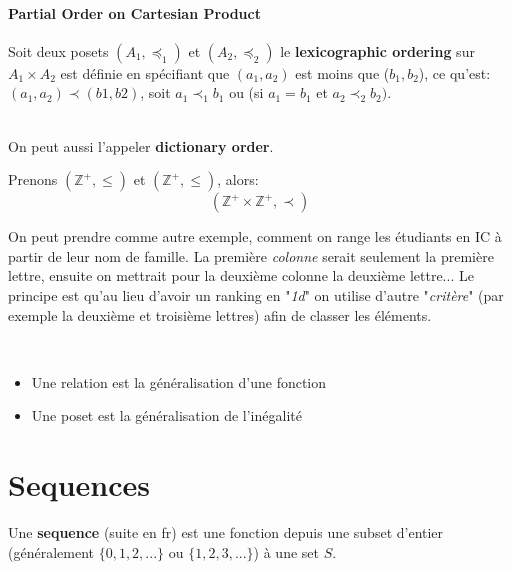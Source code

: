 \paragraph{Partial Order on Cartesian Product}
\begin{definition}
Soit deux posets $(A_1, \preceq_1)$ et $(A_2, \preceq_2)$ le \textbf{lexicographic ordering} sur $A_1 \times A_2$ est définie en spécifiant que $(a_1, a_2)$ est moins que ($b_1, b_2$), ce qu'est:
$(a_1, a_2) \prec (b1, b2)$, 
soit $a_1 \prec_1 b_1$ ou (si $a_1 = b_1$ et $a_2 \prec_2 b_2)$.
\end{definition}
\\

On peut aussi l'appeler \textbf{dictionary order}.

\begin{exemple}
    
Prenons $(\mathbb{Z}^+, \leq)$ et $(\mathbb{Z}^+, \leq)$, alors:
\begin{equation*}
    (\mathbb{Z}^+ \times \mathbb{Z}^+, \prec) 
\end{equation*}

On peut prendre comme autre exemple, comment on range les étudiants en IC à partir de leur nom de famille. La première \textit{colonne} serait seulement la première lettre, ensuite on mettrait pour la deuxième colonne la deuxième lettre... Le principe est qu'au lieu d'avoir un ranking en "\textit{1d}" on utilise d'autre "\textit{critère}" (par exemple la deuxième et troisième lettres) afin de classer les éléments.

\end{exemple}

\begin{resume}
\\
    \begin{itemize}
        \item Une relation est la généralisation d'une fonction
        \item Une poset est la généralisation de l'inégalité
    \end{itemize}
\end{resume}

\section{Sequences}
\begin{definition}[sequence]
    Une \textbf{sequence} (suite en fr) est une fonction depuis une subset d'entier (généralement $\{0, 1, 2, ...\}$ ou $\{1, 2, 3, ...\}$) à une set $S$.
\end{definition}
